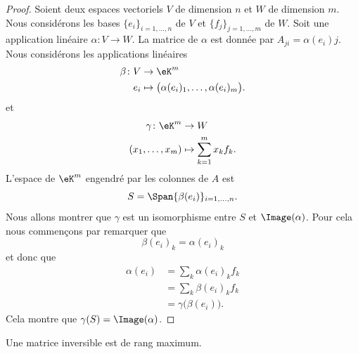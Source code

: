 \begin{proof}
	Soient deux espaces vectoriels \( V\) de dimension \( n\) et \( W\) de dimension \( m\). Nous considérons les bases \( \{ e_i \}_{i=1,\ldots,n}\) de \( V\) et \( \{ f_j \}_{j=1,\ldots,m}\) de \( W\). Soit une application linéaire \(\alpha \colon V\to W  \). La matrice de \( \alpha\) est donnée par \( A_{ji}=\alpha(e_i)j\). Nous considérons les applications linéaires
	\begin{equation}
		\begin{aligned}
			\beta\colon V & \to \eK^m                                               \\
			e_i           & \mapsto \big( \alpha(e_i)_1,\ldots,\alpha(e_i)_m \big).
		\end{aligned}
	\end{equation}
	et
	\begin{equation}
		\begin{aligned}
			\gamma\colon \eK^m & \to W                       \\
			(x_1,\ldots,x_m)   & \mapsto \sum_{k=1}^mx_kf_k.
		\end{aligned}
	\end{equation}
	L'espace de \( \eK^m\) engendré par les colonnes de \( A\) est
	\begin{equation}
		S=\Span\{ \beta(e_i) \}_{i=1,\ldots,n}.
	\end{equation}
	Nous allons montrer que \( \gamma\) est un isomorphisme entre \( S\) et \( \Image(\alpha)\). Pour cela nous commençons par remarquer que
	\begin{equation}
		\beta(e_i)_k=\alpha(e_i)_k
	\end{equation}
	et donc que
	\begin{subequations}
		\begin{align}
			\alpha(e_i) & =\sum_k\alpha(e_i)_kf_k        \\
			            & =\sum_k\beta(e_i)_kf_k         \\
			            & =\gamma\big( \beta(e_i) \big).
		\end{align}
	\end{subequations}
	Cela montre que \( \gamma(S)=\Image(\alpha)\).
\end{proof}

\begin{proposition}	\label{PROPooAPYRooGQxGoj}
	Une matrice inversible est de rang maximum.
\end{proposition}




